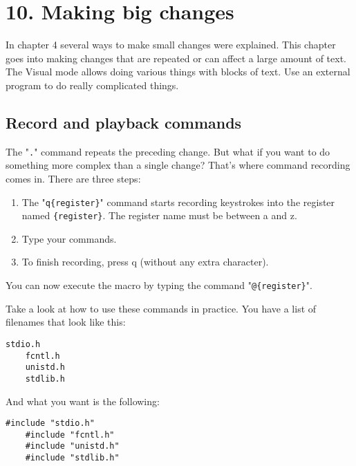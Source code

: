 \section{10. Making big changes}
In chapter 4 several ways to make small changes were explained.  This chapter
goes into making changes that are repeated or can affect a large amount of
text.  The Visual mode allows doing various things with blocks of text.  Use
an external program to do really complicated things.
\localtableofcontents
\subsection{Record and playback commands}
The "\texttt{.}" command repeats the preceding change.
But what if you want to do something more complex than a single change?  That's where command recording comes in.
There are three steps:

\begin{enumerate}
				\item The "\texttt{q\{register\}}" command starts recording keystrokes into the register named \texttt{\{register\}}.
								The register name must be between a and z.
				\item Type your commands.
				\item To finish recording, press q (without any extra character).
\end{enumerate}

You can now execute the macro by typing the command "\texttt{@\{register\}}".

Take a look at how to use these commands in practice.
You have a list of filenames that look like this:

\begin{Verbatim}[samepage=true]
    stdio.h 
    fcntl.h 
    unistd.h 
    stdlib.h 
\end{Verbatim}

And what you want is the following:

\begin{Verbatim}[samepage=true]
    #include "stdio.h" 
    #include "fcntl.h" 
    #include "unistd.h" 
    #include "stdlib.h" 
\end{Verbatim}


